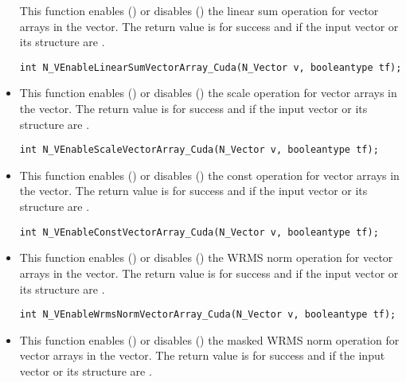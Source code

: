 \begin{itemize}
This function enables () or disables () the linear sum
operation for vector arrays in the {\cuda} vector. The return value is  for
success and  if the input vector or its  structure are .

\verb|int N_VEnableLinearSumVectorArray_Cuda(N_Vector v, booleantype tf);|


\item {}

This function enables () or disables () the scale
operation for vector arrays in the {\cuda} vector. The return value is  for
success and  if the input vector or its  structure are .

\verb|int N_VEnableScaleVectorArray_Cuda(N_Vector v, booleantype tf);|


\item {}

This function enables () or disables () the const
operation for vector arrays in the {\cuda} vector. The return value is  for
success and  if the input vector or its  structure are .

\verb|int N_VEnableConstVectorArray_Cuda(N_Vector v, booleantype tf);|


\item {}

This function enables () or disables () the WRMS norm
operation for vector arrays in the {\cuda} vector. The return value is  for
success and  if the input vector or its  structure are .

\verb|int N_VEnableWrmsNormVectorArray_Cuda(N_Vector v, booleantype tf);|


\item {}

This function enables () or disables () the masked WRMS
norm operation for vector arrays in the {\cuda} vector. The return value is
 for success and  if the input vector or its  structure are
.


\end{itemize}
